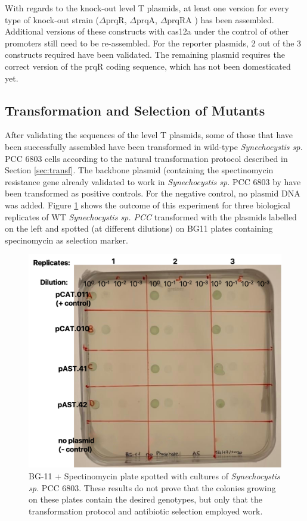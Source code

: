 With regards to the knock-out level T plasmids,  at least one version for every type of knock-out strain ($\Delta$prqR, $\Delta$prqA, $\Delta$prqRA ) has been assembled. Additional versions of these constructs with cas12a under the control of other promoters still need to be re-assembled. For the reporter plasmids, 2 out of the 3 constructs required have been validated. The remaining plasmid requires the correct version of the prqR coding sequence, which has not been domesticated yet.

\subsection{Transformation and Selection of Mutants}
\label{sec:trans}
After validating the sequences of the level T plasmids, some of those that have been successfully assembled have been transformed in wild-type \textit{Synechocystis sp.} PCC 6803 cells according to the natural transformation protocol described in Section \ref{sec:transf}. The backbone plasmid (containing the spectinomycin resistance gene already validated to work in \textit{Synechocystis sp.} PCC 6803 by \citep{Vasudevan2019} have been transformed as positive controls. For the negative control, no plasmid DNA was added. Figure \ref{fig:transplate} shows the outcome of this experiment for three biological replicates of WT \textit{Synechocystis sp. PCC} transformed with the plasmids labelled on the left and spotted (at different dilutions) on BG11 plates containing specinomycin as selection marker.

\begin{figure}[H]
    \centering
    \includegraphics[width=0.6\hsize]{figs/trans.png}
    \caption{BG-11 + Spectinomycin plate spotted with cultures of \textit{Synechocystis sp.} PCC 6803. These results do not prove that the colonies growing on these plates contain the desired genotypes, but only that the transformation protocol and antibiotic selection employed work.}
    \label{fig:transplate}
\end{figure}


